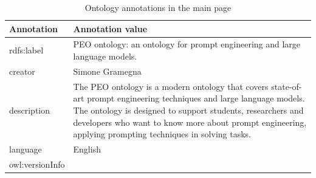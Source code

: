 \begin{table}[H]
    \centering
    \begin{tabular}{|>{\raggedright\arraybackslash}p{6cm}|>{\raggedright\arraybackslash}p{6cm}|}
        \hline
        \textbf{Annotation} & \textbf{Annotation value} \\ \hline
         rdfs:label & PEO ontology: an ontology for prompt 
         engineering and large language models. \\ \hline
         
         creator & Simone Gramegna\\ \hline
         
         description & The PEO ontology is a modern ontology that covers state-of-art prompt engineering techniques and large language models. The ontology is designed to support students, researchers and developers who want to know more about prompt engineering, applying prompting techniques in solving tasks. \\ \hline
         
         language & English \\ \hline
         
         owl:versionInfo & 1.0 \\ \hline
    \end{tabular}
    \caption{Ontology annotations in the main page}
\end{table}

